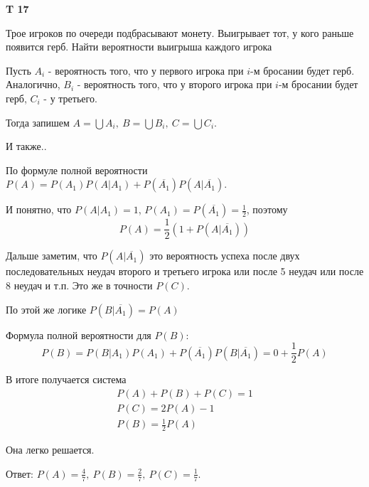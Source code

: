 \documentclass[a4paper,12pt]{article} %
\begin{document}
\begin{example}\textbf{T 17}

Трое игроков по очереди подбрасывают монету. 
Выигрывает тот, у кого раньше появится герб. 
Найти вероятности выигрыша каждого игрока

Пусть $A_i$ - вероятность того, что у первого игрока при $ i$-м бросании будет герб. 
Аналогично, $B_i$ - вероятность того, что у второго игрока при $ i$-м бросании будет герб, $ C_i$ - у третьего.

Тогда запишем $A=\bigcup A_i, \ B=\bigcup B_i, \ C=\bigcup C_i$.

И также..


По формуле полной вероятности $ P(A)= P(A_1) P(A|A_1)+ P(\overline{A_1}) P(A|\overline{A_1})$. 

И понятно, что $P(A|A_1)=1$, $P(A_1)=P(\overline{A_1})=\frac{1}{2}$, поэтому 
\[ P(A)=\frac{1}{2}(1+P(A|\overline{A_1})) \]

Дальше заметим, что $P(A|\overline{A_1})$ это вероятность успеха после двух последовательных неудач второго и третьего 
игрока или после 5 неудач или после 8 неудач и т.п. Это же в точности $ P(C)$.

По этой же логике $ P(B|\overline{A_1})=P(A) $

Формула полной вероятности для $ P(B)$:
\[ P(B)=P(B|A_1) P(A_1)+P(\overline{A_1}) P(B|\overline{A_1})=0+\frac{1}{2} P(A) \]

В итоге получается система 
\begin{align}
P(A)+P(B)+P(C)=1\\
P(C)=2P(A)-1\\
P(B)=\frac{1}{2} P(A)
\end{align}

Она легко решается.

Ответ: $ P(A)=\frac{4}{7}, \ P(B)=\frac{2}{7}, \ P(C)=\frac{1}{7}$.


\end{example}
\end{document}
